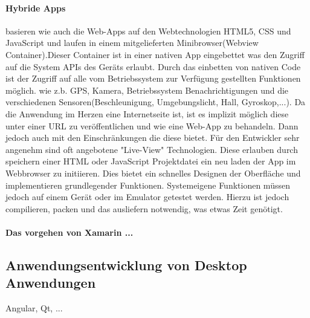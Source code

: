
\paragraph{Hybride Apps} basieren wie auch die Web-Apps auf den Webtechnologien HTML5, CSS und JavaScript und laufen in einem mitgelieferten Minibrowser(Webview Container).Dieser Container ist in einer nativen App eingebettet was den Zugriff auf die System APIs des Geräts erlaubt. Durch das einbetten von nativen Code ist der Zugriff auf alle vom Betriebssystem zur Verfügung gestellten Funktionen möglich. wie z.b. GPS, Kamera, Betriebssystem Benachrichtigungen und die verschiedenen Sensoren(Beschleunigung, Umgebungslicht, Hall, Gyroskop,...). 
Da die Anwendung im Herzen eine Internetseite ist, ist es implizit möglich diese unter einer URL zu veröffentlichen und wie eine Web-App zu behandeln. Dann jedoch auch mit den Einschränkungen die diese bietet. Für den Entwickler sehr angenehm sind oft angebotene "Live-View" Technologien. Diese erlauben durch speichern einer HTML oder JavaScript Projektdatei ein neu laden der App im Webbrowser zu initiieren. Dies bietet ein schnelles Designen der Oberfläche und implementieren grundlegender Funktionen. Systemeigene Funktionen müssen jedoch auf einem Gerät oder im Emulator getestet werden. Hierzu ist jedoch compilieren, packen und das ausliefern notwendig, was etwas Zeit genötigt.


\paragraph{Das vorgehen von Xamarin  ...}
\subsection{Anwendungsentwicklung von Desktop Anwendungen}
Angular, Qt, ...